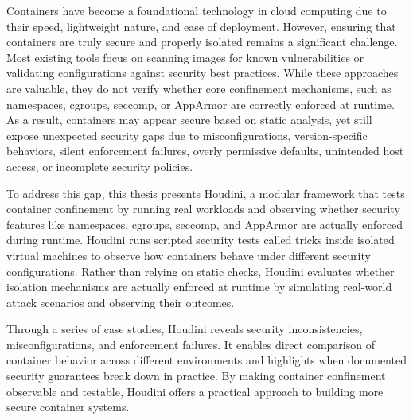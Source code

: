 \documentclass[12pt]{report}
\begin{document}
\begin{doublespace}
Containers have become a foundational technology in cloud computing due to their speed, lightweight nature, and ease of deployment. However, ensuring that containers are truly secure and properly isolated remains a significant challenge. Most existing tools focus on scanning images for known vulnerabilities or validating configurations against security best practices. While these approaches are valuable, they do not verify whether core confinement mechanisms, such as namespaces, cgroups, seccomp, or AppArmor are correctly enforced at runtime. As a result, containers may appear secure based on static analysis, yet still expose unexpected security gaps due to misconfigurations, version-specific behaviors, silent enforcement failures, overly permissive defaults, unintended host access, or incomplete security policies.

To address this gap, this thesis presents Houdini, a modular framework that tests container confinement by running real workloads and observing whether security features like namespaces, cgroups, seccomp, and AppArmor are actually enforced during runtime. Houdini runs scripted security tests called tricks inside isolated virtual machines to observe how containers behave under different security configurations. Rather than relying on static checks, Houdini evaluates whether isolation mechanisms are actually enforced at runtime by simulating real-world attack scenarios and observing their outcomes.

Through a series of case studies, Houdini reveals security inconsistencies, misconfigurations, and enforcement failures. It enables direct comparison of container behavior across different environments and highlights when documented security guarantees break down in practice. By making container confinement observable and testable, Houdini offers a practical approach to building more secure container systems.


\end{doublespace} \tableofcontents
	\listoftables
	\listoffigures
	\printglossary[type=acronym, title=Nomenclature]
	\fontsize{12pt}{14pt} \selectfont
\end{document}
